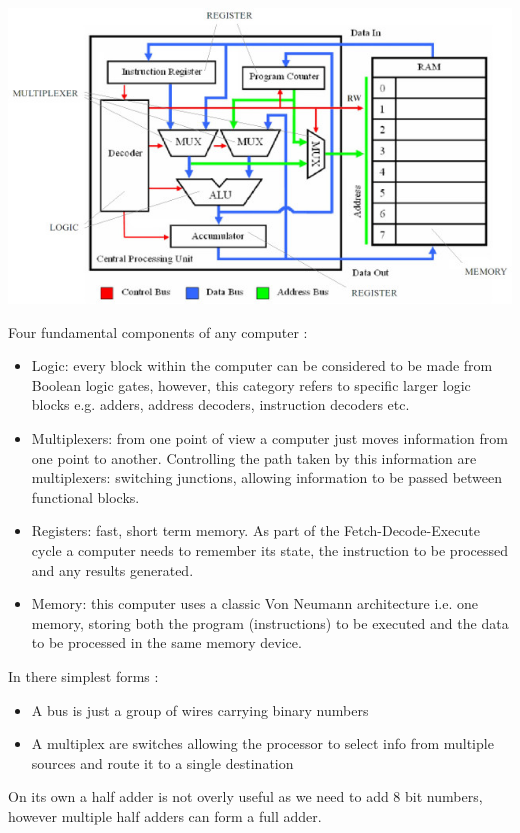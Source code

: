 \includegraphics[scale=1]{images/cpu.jpg} 

Four fundamental components of any computer : 
\begin{itemize}
	\item Logic: every block within the computer can be considered to be made from Boolean logic gates, however, this category refers to specific larger logic blocks e.g. adders, address decoders, instruction decoders etc.
	\item Multiplexers: from one point of view a computer just moves information from one point to another. Controlling the path taken by this information are multiplexers: switching junctions, allowing information to be passed between functional blocks.
	\item Registers: fast, short term memory. As part of the Fetch-Decode-Execute cycle a computer needs to remember its state, the instruction to be processed and any results generated.
	\item Memory: this computer uses a classic Von Neumann architecture i.e. one memory, storing both the program (instructions) to be executed and the data to be processed in the same memory device.
\end{itemize}

In there simplest forms : 
\begin{itemize}
	\item A bus is just a group of wires carrying binary numbers
	\item A multiplex are switches allowing the processor to select info from multiple sources and route it to a single destination
\end{itemize}

On its own a half adder is not overly useful as we need to add 8 bit numbers, however multiple half adders can form a full adder. 

